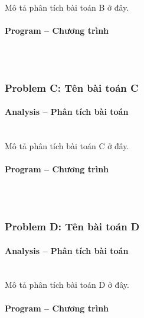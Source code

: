 Mô tả phân tích bài toán B ở đây.

\paragraph{Program -- Chương trình} \mbox{} \\

\begin{lstlisting}

\end{lstlisting}

\subsubsection{Problem C: Tên bài toán C}

\paragraph{Analysis -- Phân tích bài toán} \mbox{} \\

Mô tả phân tích bài toán C ở đây.

\paragraph{Program -- Chương trình} \mbox{} \\

\begin{lstlisting}

\end{lstlisting}

\subsubsection{Problem D: Tên bài toán D}

\paragraph{Analysis -- Phân tích bài toán} \mbox{} \\

Mô tả phân tích bài toán D ở đây.

\paragraph{Program -- Chương trình} \mbox{} \\

\begin{lstlisting}

\end{lstlisting}

